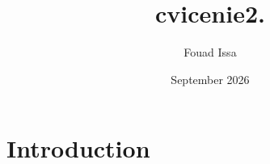 \documentclass{article}
\title{ cvicenie2.}
\author{Fouad Issa}
\date{September 2026}
\begin{document}
\maketitle

\section{Introduction}
\end{document}
